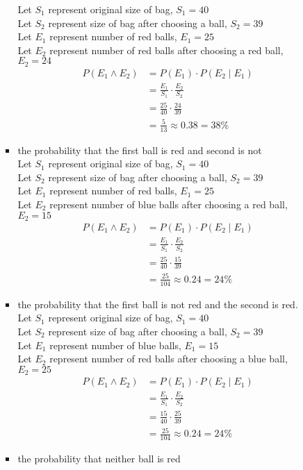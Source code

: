 \documentclass{article}
\begin{document}
\begin{enumerate}
\begin{enumerate}
\begin{itemize}
Let $S_{1}$ represent original size of bag, $S_{1} = 40$\\
Let $S_{2}$ represent size of bag after choosing a ball, $S_{2} = 39$\\
Let $E_{1}$ represent number of red balls, $E_{1} = 25$\\
Let $E_{2}$ represent number of red balls after choosing a red ball, $E_{2} = 24$\\
\begin {align}
P(E_{1} \land E_{2}) &= P(E_{1}) \cdot P(E_{2} \mid E_{1})\\
&= \frac{E_{1}}{S_{1}} \cdot \frac{E_{2}}{S_{2}}\\
&= \frac{25}{40} \cdot \frac{24}{39}\\
&= \frac{5}{13} \approx 0.38 = 38\%
\end {align}

\item the probability that the first ball is red and second is not\\

Let $S_{1}$ represent original size of bag, $S_{1} = 40$\\
Let $S_{2}$ represent size of bag after choosing a ball, $S_{2} = 39$\\
Let $E_{1}$ represent number of red balls, $E_{1} = 25$\\
Let $E_{2}$ represent number of blue balls after choosing a red ball, $E_{2} = 15$\\
\begin {align}
P(E_{1} \land E_{2}) &= P(E_{1}) \cdot P(E_{2} \mid E_{1})\\
&= \frac{E_{1}}{S_{1}} \cdot \frac{E_{2}}{S_{2}}\\
&= \frac{25}{40} \cdot \frac{15}{39}\\
&= \frac{25}{104} \approx 0.24 = 24\%
\end {align}
\item the probability that the first ball is not red and the second is red.\\

Let $S_{1}$ represent original size of bag, $S_{1} = 40$\\
Let $S_{2}$ represent size of bag after choosing a ball, $S_{2} = 39$\\
Let $E_{1}$ represent number of blue balls, $E_{1} = 15$\\
Let $E_{2}$ represent number of red balls after choosing a blue ball, $E_{2} = 25$\\
\begin {align}
P(E_{1} \land E_{2}) &= P(E_{1}) \cdot P(E_{2} \mid E_{1})\\
&= \frac{E_{1}}{S_{1}} \cdot \frac{E_{2}}{S_{2}}\\
&= \frac{15}{40} \cdot \frac{25}{39}\\
&= \frac{25}{104} \approx 0.24 = 24\%
\end {align}
\item the probability that neither ball is red\\


\end{itemize}
\end{enumerate}
\end{enumerate}
\end{document}
